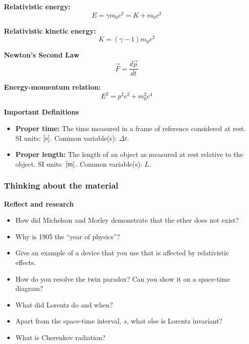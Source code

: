 \begin{framed}
\textbf{Relativistic energy:}
\begin{equation}
E = \gamma m_0 c^2 = K + m_0c^2
\end{equation}

\textbf{Relativistic kinetic energy:}
\begin{equation}
K=(\gamma -1) m_0c^2
\end{equation}

\textbf{Newton's Second Law}
\begin{equation}
\vec F = \frac{d\vec p }{dt}
\end{equation}

\textbf{Energy-momentum relation:}
\begin{equation}
E^2 = p^2c^2 +m_0^2c^4
\end{equation}
\end{framed}

\begin{framed}
\textbf{Important Definitions}\\
\begin{itemize}
\item \textbf{Proper time:} The time measured in a frame of reference considered at rest. SI units: ${\rm \left[{s}\right]}$. Common variable(s): $\Delta t$.
\item \textbf{Proper length:} The length of an object as measured at rest relative to the object. SI units: ${\rm \left[{m}\right]}$. Common variable(s): $L$.
\end{itemize}
\end{framed}

\subsubsection{Thinking about the material}

\begin{framed}
\textbf{Reflect and research}\\
\begin{itemize}
\item How did Michelson and Morley demonstrate that the ether does not exist?
\item Why is 1905 the ``year of physics''?
\item Give an example of a device that you use that is affected by relativistic effects.
\item How do you resolve the twin paradox? Can you show it on a space-time diagram?
\item What did Lorentz do and when?
\item Apart from the space-time interval, $s$, what else is Lorentz invariant?
\item What is Cherenkov radiation?
\end{itemize}
\end{framed}

